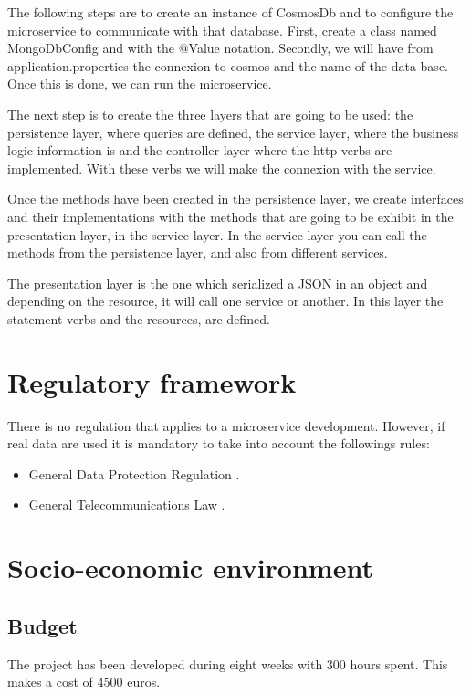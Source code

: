 \documentclass[12pt]{report} %
\begin{document}
The following steps are to create an instance of CosmosDb and to configure the microservice to communicate with that database. First, create a class named MongoDbConfig and with the @Value notation. Secondly, we will have from application.properties the connexion to cosmos and the name of the data base. Once this is done, we can run the microservice.

The next step is to create the three layers that are going to be used: the persistence layer, where queries are defined, the service layer, where the business logic information is and the controller layer where the http verbs are implemented. With these verbs we will make the connexion with the service.

Once the methods have been created in the persistence layer, we create interfaces and their implementations with the methods that are going to be exhibit in the presentation layer, in the service layer.
In the service layer you can call the methods from the persistence layer, and also from different services.

The presentation layer is the one which serialized a JSON in an object and depending on the resource, it will call one service or another. In this layer the statement verbs and the resources, are defined.

\section{Regulatory framework}

There is no regulation that applies to a microservice development. However, if real data are used it is mandatory to take into account the followings rules:
\begin{itemize}
	\item General Data Protection Regulation \cite{gdpr}.
	\item General Telecommunications Law \cite{LeyComunicaciones}.
\end{itemize}


\section{Socio-economic environment}	

\subsection{Budget}

The project has been developed during eight weeks with 300 hours spent. This makes a cost of 4500 euros. 
\end{document}
